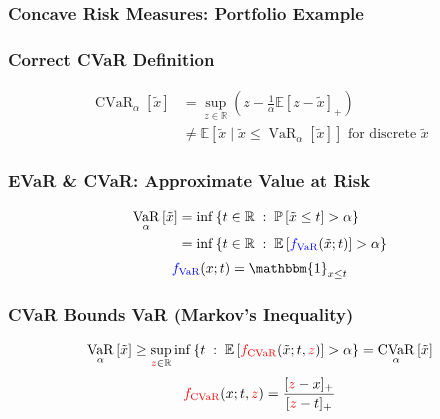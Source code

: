 \documentclass{beamer}
\newcommand{\tc}[2]{\textcolor{#1}{#2}}
\newcommand{\tcb}[1]{\tc{blue}{#1}}
\newcommand{\tcr}[1]{\tc{red}{#1}}
\newcommand{\Real}{\mathbb{R}}
\newcommand{\E}{\mathbb{E}}
\newcommand{\Ex}[1]{\E \left[#1 \right]}
\newcommand{\Ind}[1]{\mathbbm{1}_{#1}}
\DeclareMathOperator{\varo}{VaR}
\DeclareMathOperator{\cvaro}{CVaR}
\renewcommand{\Pr}[1]{\mathbb{P}\left[ #1 \right]}
\newcommand{\var}[2]{\varo_{#1} \left[#2\right]}
\newcommand{\cvar}[2]{\cvaro_{#1} \left[#2\right]}
\begin{document}
\begin{frame} \frametitle{Concave Risk Measures: Portfolio Example}
  \begin{center}
  \end{center}
\end{frame}

\begin{frame} \frametitle{Correct CVaR Definition}
\begin{align*}
    \cvar{\alpha}{\tilde{x}}
    &=
    \sup_{z\in\mathbb R}\left(z-\frac{1}{\alpha} \E\left[z-\tilde{x}\right]_+\right) \\
    &\neq
    \Ex{\tilde{x} \mid  \tilde{x} \le \var{\alpha}{\tilde{x}}} \text{ for discrete } \tilde{x}
\end{align*}
\begin{center}
\end{center}
\end{frame}


\begin{frame} \frametitle{EVaR \& CVaR: Approximate Value at Risk}
  \begin{align*}
    \var{\alpha}{\tilde{x}}
    &= \inf\left\{ t\in \Real \;:\; \Pr{\tilde{x} \le t} > \alpha\right\}  \\
    &= \inf\left\{ t\in \Real \;:\; \Ex{\tcb{f_{\varo}}(\tilde{x}; t)} >  \alpha\right\}
    \end{align*}
  \[
    \tcb{f_{\varo}}(x; t) = \Ind{x \le t}
  \]
  \begin{center}
  \end{center} 
\end{frame}

\begin{frame} \frametitle{CVaR Bounds VaR  (Markov's Inequality)}
  \begin{align*}
    \var{\alpha}{\tilde{x}} \ge \sup_{\tcr{z} \in \Real}\inf
    \left\{ t \;:\; \Ex{\tcr{f_{\cvaro}}(\tilde{x}; t, \tcr{z})} > \alpha\right\} = \cvar{\alpha}{\tilde{x}}                
  \end{align*}
  \[
    \tcr{f_{\cvaro}}(x; t, \tcr{z}) = \frac{[\tcr{ z }-x]_+}{[\tcr{z}-t]_+}
  \]
  \vfill 
  \begin{center}
  \end{center}
\end{frame}
\end{document}
